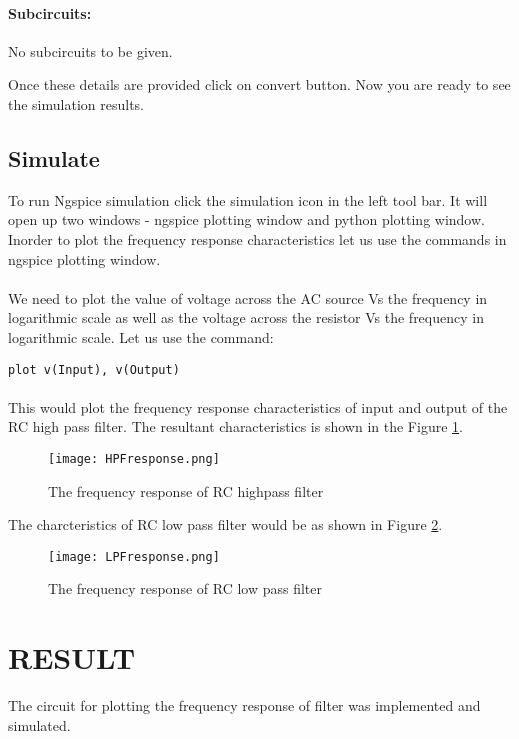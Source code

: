 \paragraph{Subcircuits:} No subcircuits to be given.

\noindent Once these details are provided click on convert button.  Now you are ready to see the simulation results.


\paragraph{}
\subsection{Simulate} To run Ngspice simulation click the simulation icon in the left tool bar. It will open up two windows - ngspice plotting window and python plotting window. Inorder to plot the frequency response characteristics let us use the commands in ngspice plotting window. 

\paragraph{}We need to plot the value of voltage across the AC source Vs the frequency in logarithmic scale as well as the voltage across the resistor Vs the frequency in logarithmic scale. Let us use the command:

\texttt{plot v(Input), v(Output) }

\paragraph{}

This would plot the frequency response characteristics of input and output of the RC high pass filter. The resultant characteristics is shown in the Figure \ref{HPFresponse}. 

\begin{figure}[h]
\centering
\texttt{[image: HPFresponse.png]}
\caption{The frequency response of RC highpass filter}
\label{HPFresponse}
\end{figure}

The charcteristics of RC low pass filter would be as shown in Figure \ref{LPFresponse}.

\begin{figure}[h]
\centering
\texttt{[image: LPFresponse.png]}
\caption{The frequency response of RC low pass filter}
\label{LPFresponse}
\end{figure}


\section*{RESULT}
The circuit for plotting the frequency response of filter was implemented and simulated.


